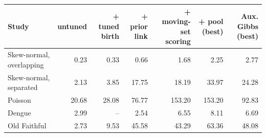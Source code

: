 \begin{tabular}{l rrrrr r}
\toprule
Study & untuned & + tuned birth & + prior link & + moving-set scoring & + pool (best) & Aux. Gibbs (best) \\
\midrule
Skew-normal, overlapping & 0.23 & 0.33 & 0.66 & 1.68 & 2.25 & 2.77 \\
Skew-normal, separated & 2.13 & 3.85 & 17.75 & 18.19 & 33.97 & 24.28 \\
Poisson & 20.68 & 28.08 & 76.77 & 153.20 & 153.20 & 92.83 \\
Dengue & 2.99 & -- & 2.54 & 6.55 & 8.11 & 6.69 \\
Old Faithful & 2.73 & 9.53 & 45.58 & 43.29 & 63.36 & 48.08 \\
\bottomrule
\end{tabular}
